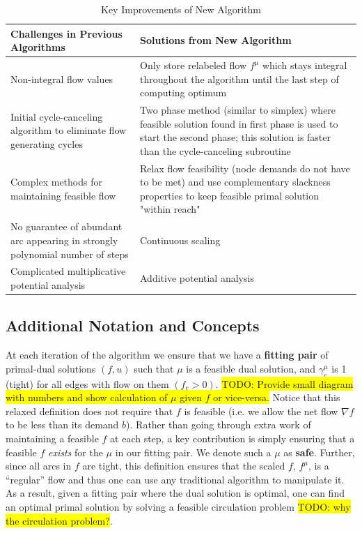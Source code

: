 \documentclass[12pt]{article}
\theoremstyle{definition}
\newcommand{\todo}[1]{\colorbox{yellow}{TODO: #1}}
\begin{document}
\begin{table}[H]
\begin{center}
    \begin{tabular}{ | p{7cm} | p{7cm} |}
    \hline
    Challenges in Previous Algorithms  & Solutions from New Algorithm \\ \hline
    Non-integral flow values & Only store relabeled flow $f^{\mu}$ which stays integral throughout the algorithm until the last step of computing optimum \\ \hline
    Initial cycle-canceling algorithm to eliminate flow generating cycles & Two phase method (similar to simplex) where feasible solution found in first phase is used to start the second phase; this solution is faster than the cycle-canceling subroutine \\ \hline
    Complex methods for maintaining feasible flow & Relax flow feasibility (node demands do not have to be met) and use complementary slackness properties to keep feasible primal solution "within reach" \\ \hline
    No guarantee of abundant arc appearing in strongly polynomial number of steps \cite{Radzik2004} &  Continuous scaling\\ \hline
    Complicated multiplicative potential analysis \cite{Vegh2013} & Additive potential analysis \\
    \hline
    \end{tabular}
\end{center}
\caption{Key Improvements of New Algorithm}
\label{tab:improvements}
\end{table}
    \subsection{Additional Notation and Concepts}
At each iteration of the algorithm we ensure that we have a \textbf{fitting pair} of primal-dual solutions $(f,u)$ such that $\mu$ is a feasible dual solution, and $\gamma_e^{\mu}$ is 1 (tight) for all edges with flow on them $(f_e > 0)$. \todo{Provide small diagram with numbers and show calculation of $\mu$ given $f$ or vice-versa.} Notice that this relaxed definition does not require that $f$ is feasible (i.e. we allow the net flow $\nabla f $ to be less than its demand $b$). Rather than going through extra work of maintaining a feasible $f$ at each step, a key contribution is simply ensuring that a feasible $f$ \textit{exists} for the $\mu$ in our fitting pair. We denote such a $\mu$ as \textbf{safe}. Further, since all arcs in $f$ are tight, this definition ensures that the scaled $f$, $f^{\mu}$, is a ``regular'' flow and thus one can use any traditional algorithm to manipulate it. As a result, given a fitting pair where the dual solution is optimal, one can find an optimal primal solution by solving a feasible circulation problem \todo{why the circulation problem?}. 
\end{document}
